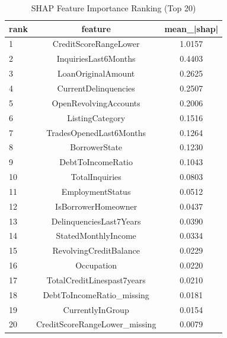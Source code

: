 \begin{table}
\centering
\caption{SHAP Feature Importance Ranking (Top 20)}
\label{tab:shap_ranking}
\begin{tabular}{lcc}
\toprule
rank & feature & mean_|shap| \\
\midrule
1 & CreditScoreRangeLower & 1.0157 \\
2 & InquiriesLast6Months & 0.4403 \\
3 & LoanOriginalAmount & 0.2625 \\
4 & CurrentDelinquencies & 0.2507 \\
5 & OpenRevolvingAccounts & 0.2006 \\
6 & ListingCategory & 0.1516 \\
7 & TradesOpenedLast6Months & 0.1264 \\
8 & BorrowerState & 0.1230 \\
9 & DebtToIncomeRatio & 0.1043 \\
10 & TotalInquiries & 0.0803 \\
11 & EmploymentStatus & 0.0512 \\
12 & IsBorrowerHomeowner & 0.0437 \\
13 & DelinquenciesLast7Years & 0.0390 \\
14 & StatedMonthlyIncome & 0.0334 \\
15 & RevolvingCreditBalance & 0.0229 \\
16 & Occupation & 0.0220 \\
17 & TotalCreditLinespast7years & 0.0210 \\
18 & DebtToIncomeRatio_missing & 0.0181 \\
19 & CurrentlyInGroup & 0.0154 \\
20 & CreditScoreRangeLower_missing & 0.0079 \\
\bottomrule
\end{tabular}
\end{table}
